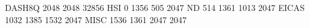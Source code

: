 DASH8Q 2048 2048 32856
HSI    0  1356  505  2047
ND     514  1361  1013  2047
EICAS  1032  1385   1532  2047
MISC   1536  1361  2047  2047
